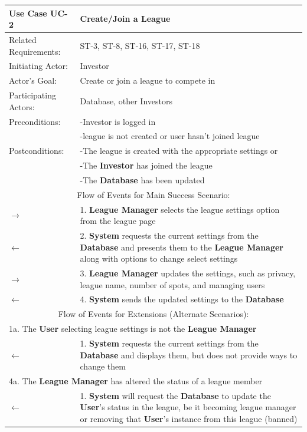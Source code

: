 \begin{centering}
\renewcommand\arraystretch{1.3}
\label{UC-2}
\begin{longtable}{|p{1.2in} p{5in}|}
\hline
\bfseries{\color{color1}Use Case UC-2} &
\bfseries{\color{color1}Create/Join a League} \\
\hline
Related Requirements: & ST-3, ST-8, ST-16, ST-17, ST-18\\
Initiating Actor:     & Investor \\
Actor's Goal:         & Create or join a league to compete in\\
Participating Actors: & Database, other Investors \\
Preconditions:        & -Investor is logged in \\
                      & -league is not created or user hasn't joined league \\
Postconditions:       & -The league is created with the appropriate settings or \\
                      & -The \textbf{Investor} has joined the league \\
                      & -The \textbf{Database} has been updated \\
\hline
\multicolumn{2}{|c|}{\color{color1}Flow of Events for Main Success Scenario:}\\
\hline
$\rightarrow$ & 1. \textbf{League Manager} selects the league settings option from the league page \\
$\leftarrow$ & 2. \textbf{System} requests the current settings from the \textbf{Database} and presents them to the \textbf{League Manager} along with options to change select settings \\
$\rightarrow$ & 3. \textbf{League Manager} updates the settings, such as privacy, league name, number of spots, and managing users \\
$\leftarrow$ & 4. \textbf{System} sends the updated settings to the \textbf{Database} \\
\hline
\multicolumn{2}{|c|}{\color{color1}Flow of Events for Extensions (Alternate Scenarios):} \\
\hline
\multicolumn{2}{|p{6.2in}|}{1a. The \textbf{User} selecting league settings is not the \textbf{League Manager}} \\
\hline
$\leftarrow$ & 1. \textbf{System} requests the current settings from the \textbf{Database} and displays them, but does not provide ways to change them \\
\hline
\multicolumn{2}{|p{6.2in}|}{4a. The \textbf{League Manager} has altered the status of a league member} \\
\hline
$\leftarrow$ & 1. \textbf{System} will request the \textbf{Database} to update the \textbf{User}'s status in the league, be it becoming league manager or removing that \textbf{User}'s instance from this league (banned)\\
\hline
\end{longtable}
\end{centering}

